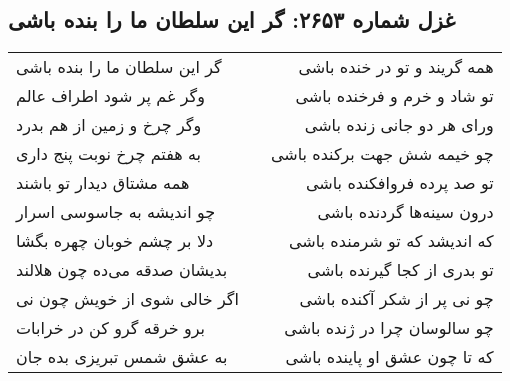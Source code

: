 \begin{center}
\section*{غزل شماره ۲۶۵۳: گر این سلطان ما را بنده باشی}
\label{sec:2653}
\begin{longtable}{l p{0.5cm} r}
گر این سلطان ما را بنده باشی
&&
همه گریند و تو در خنده باشی
\\
وگر غم پر شود اطراف عالم
&&
تو شاد و خرم و فرخنده باشی
\\
وگر چرخ و زمین از هم بدرد
&&
ورای هر دو جانی زنده باشی
\\
به هفتم چرخ نوبت پنج داری
&&
چو خیمه شش جهت برکنده باشی
\\
همه مشتاق دیدار تو باشند
&&
تو صد پرده فروافکنده باشی
\\
چو اندیشه به جاسوسی اسرار
&&
درون سینه‌ها گردنده باشی
\\
دلا بر چشم خوبان چهره بگشا
&&
که اندیشد که تو شرمنده باشی
\\
بدیشان صدقه می‌ده چون هلالند
&&
تو بدری از کجا گیرنده باشی
\\
اگر خالی شوی از خویش چون نی
&&
چو نی پر از شکر آکنده باشی
\\
برو خرقه گرو کن در خرابات
&&
چو سالوسان چرا در ژنده باشی
\\
به عشق شمس تبریزی بده جان
&&
که تا چون عشق او پاینده باشی
\\
\end{longtable}
\end{center}
